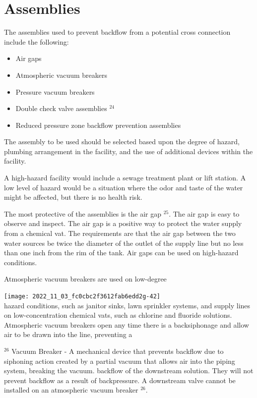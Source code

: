\documentclass[10pt]{article}
\begin{document}
\section{Assemblies}
The assemblies used to prevent backflow from a potential cross connection include the following:

\begin{itemize}
  \item Air gaps

  \item Atmospheric vacuum breakers

  \item Pressure vacuum breakers

  \item Double check valve assemblies ${ }^{24}$

  \item Reduced pressure zone backflow prevention assemblies

\end{itemize}
The assembly to be used should be selected based upon the degree of hazard, plumbing arrangement in the facility, and the use of additional devices within the facility.

A high-hazard facility would include a sewage treatment plant or lift station. A low level of hazard would be a situation where the odor and taste of the water might be affected, but there is no health risk.

The most protective of the assemblies is the air gap $^{25}$. The air gap is easy to observe and inspect. The air gap is a positive way to protect the water supply from a chemical vat. The requirements are that the air gap between the two water sources be twice the diameter of the outlet of the supply line but no less than one inch from the rim of the tank. Air gaps can be used on high-hazard conditions.

Atmospheric vacuum breakers are used on low-degree

\texttt{[image: 2022\_11\_03\_fc0cbc2f3612fab6edd2g-42]}\\
hazard conditions, such as janitor sinks, lawn sprinkler systems, and supply lines on low-concentration chemical vats, such as chlorine and fluoride solutions. Atmospheric vacuum breakers open any time there is a backsiphonage and allow air to be drawn into the line, preventing a

${ }^{26}$ Vacuum Breaker - A mechanical device that prevents backflow due to siphoning action created by a partial vacuum that allows air into the piping system, breaking the vacuum. backflow of the downstream solution. They will not prevent backflow as a result of backpressure. A downstream valve cannot be installed on an atmospheric vacuum breaker ${ }^{26}$.
\end{document}
